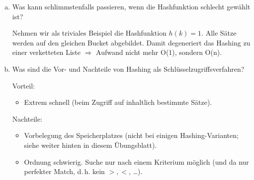 \begin{enumerate}[a)]
	\item Was kann schlimmstenfalls passieren, wenn die Hashfunktion schlecht gewählt ist?

	\begin{solution}
	Nehmen wir als triviales Beispiel die Hashfunktion $h(k)=1$. Alle Sätze werden auf den gleichen Bucket abgebildet. Damit degeneriert das Hashing zu einer verketteten Liste $\Rightarrow$ Aufwand nicht mehr O(1), sondern O(n).
	\end{solution}

	\item Was sind die Vor- und Nachteile von Hashing als Schlüsselzugriffsverfahren?

	\begin{solution}
	Vorteil:
	\begin{itemize}
		\item Extrem schnell (beim Zugriff auf inhaltlich bestimmte Sätze).
	\end{itemize}
	Nachteile:
	\begin{itemize}
		\item Vorbelegung des Speicherplatzes (nicht bei einigen Hashing-Varianten; siehe weiter hinten in diesem Übungsblatt).
		\item Ordnung schwierig. Suche nur nach einem Kriterium möglich (und da nur perfekter Match, d.\,h. kein $>, <$, \ldots).
	\end{itemize}
	\end{solution}

\end{enumerate}
